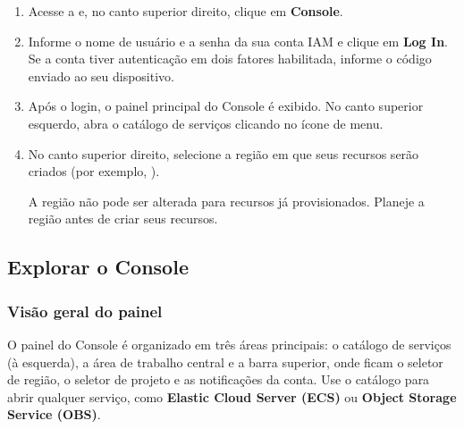 \documentclass{guide}
\begin{document}
\passoapasso
\begin{enumerate}
  \item Acesse a 
        e, no canto superior direito, clique em \textbf{Console}.


  \item Informe o nome de usuário e a senha da sua conta IAM e clique em
        \textbf{Log In}. Se a conta tiver autenticação em dois fatores habilitada,
        informe o código enviado ao seu dispositivo.

  \item Após o login, o painel principal do Console é exibido. No canto
        superior esquerdo, abra o catálogo de serviços clicando no ícone de
        menu.


  \item No canto superior direito, selecione a região em que seus recursos
        serão criados (por exemplo, ).


  \begin{aviso}
  A região não pode ser alterada para recursos já provisionados.
  Planeje a região antes de criar seus recursos.
  \end{aviso}
\end{enumerate}

\subsection{Explorar o Console}

\subsubsection{Visão geral do painel}

O painel do Console é organizado em três áreas principais: o catálogo de
serviços (à esquerda), a área de trabalho central e a barra superior, onde
ficam o seletor de região, o seletor de projeto e as notificações da conta.
Use o catálogo para abrir qualquer serviço, como \textbf{Elastic Cloud Server
(ECS)} ou \textbf{Object Storage Service (OBS)}.
\end{document}
